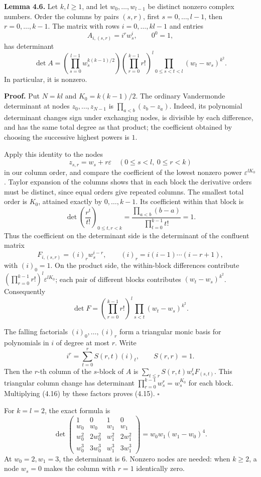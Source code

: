 \documentclass[
  11pt,
  a4paper,
]{article}
\begin{document}
\textbf{Lemma 4.6.} Let \(k,l\ge1\), and let \(w_0,\ldots,w_{l-1}\) be
distinct nonzero complex numbers. Order the columns by pairs \((s,r)\),
first \(s=0,\ldots,l-1\), then \(r=0,\ldots,k-1\). The matrix with rows
\(i=0,\ldots,kl-1\) and entries \[
A_{i,(s,r)}=i^r w_s^i,\qquad 0^0=1,
\] has determinant \[
\det A=
\left(\prod_{s=0}^{l-1}w_s^{k(k-1)/2}\right)
\left(\prod_{r=0}^{k-1}r!\right)^l
\prod_{0\le s<t<l}(w_t-w_s)^{k^2}. \tag{4.15}
\] In particular, it is nonzero.

\textbf{Proof.} Put \(N=kl\) and \(K_0=k(k-1)/2\). The ordinary
Vandermonde determinant at nodes \(z_0,\ldots,z_{N-1}\) is
\(\prod_{a<b}(z_b-z_a)\). Indeed, its polynomial determinant changes
sign under exchanging nodes, is divisible by each difference, and has
the same total degree as that product; the coefficient obtained by
choosing the successive highest powers is \(1\).

Apply this identity to the nodes \[
z_{s,r}=w_s+r\varepsilon\quad(0\le s<l,\ 0\le r<k)
\] in our column order, and compare the coefficient of the lowest
nonzero power \(\varepsilon^{lK_0}\). Taylor expansion of the columns
shows that in each block the derivative orders must be distinct, since
equal orders give repeated columns. The smallest total order is \(K_0\),
attained exactly by \(0,\ldots,k-1\). Its coefficient within that block
is \[
\det\left(\frac{r^t}{t!}\right)_{0\le t,r<k}
=\frac{\prod_{a<b}(b-a)}{\prod_{t=0}^{k-1}t!}=1.
\] Thus the coefficient on the determinant side is the determinant of
the confluent matrix \[
F_{i,(s,r)}=(i)_r w_s^{i-r},\qquad
(i)_r=i(i-1)\cdots(i-r+1),
\] with \((i)_0=1\). On the product side, the within-block differences
contribute \(\left(\prod_{r=0}^{k-1}r!\right)^l\varepsilon^{lK_0}\);
each pair of different blocks contributes \((w_t-w_s)^{k^2}\).
Consequently \[
\det F=\left(\prod_{r=0}^{k-1}r!\right)^l
\prod_{s<t}(w_t-w_s)^{k^2}. \tag{4.16}
\]

The falling factorials \((i)_0,\ldots,(i)_r\) form a triangular monic
basis for polynomials in \(i\) of degree at most \(r\). Write \[
i^r=\sum_{t=0}^r S(r,t)(i)_t,\qquad S(r,r)=1.
\] Then the \(r\)-th column of the \(s\)-block of \(A\) is
\(\sum_{t\le r}S(r,t)w_s^t F_{(s,t)}\). This triangular column change
has determinant \(\prod_{r=0}^{k-1}w_s^r=w_s^{K_0}\) for each block.
Multiplying (4.16) by these factors proves (4.15). \(\square\)

For \(k=l=2\), the exact formula is \[
\det\begin{pmatrix}
1&0&1&0\\
w_0&w_0&w_1&w_1\\
w_0^2&2w_0^2&w_1^2&2w_1^2\\
w_0^3&3w_0^3&w_1^3&3w_1^3
\end{pmatrix}
=w_0w_1(w_1-w_0)^4. \tag{4.17}
\] At \(w_0=2,w_1=3\), the determinant is \(6\). Nonzero nodes are
needed: when \(k\ge2\), a node \(w_s=0\) makes the column with \(r=1\)
identically zero.
\end{document}

